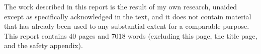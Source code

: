 
\begin{declaration}

    The work described in this report is the result of my own research, unaided except as specifically acknowledged in the text, and it does not contain material that has already been used to any substantial extent for a comparable purpose. This report contains 40 pages and 7018 words (excluding this page, the title page, and the safety appendix).


\end{declaration}

